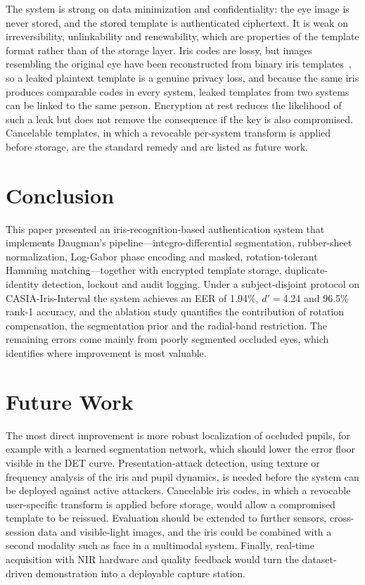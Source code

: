 \documentclass[conference]{IEEEtran}
\begin{document}
The system is strong on data minimization and confidentiality: the eye image is never stored, and the stored template is authenticated ciphertext. It is weak on irreversibility, unlinkability and renewability, which are properties of the template format rather than of the storage layer. Iris codes are lossy, but images resembling the original eye have been reconstructed from binary iris templates~\cite{galbally2013}, so a leaked plaintext template is a genuine privacy loss, and because the same iris produces comparable codes in every system, leaked templates from two systems can be linked to the same person. Encryption at rest reduces the likelihood of such a leak but does not remove the consequence if the key is also compromised. Cancelable templates, in which a revocable per-system transform is applied before storage, are the standard remedy and are listed as future work.

\section{Conclusion}
This paper presented an iris-recognition-based authentication system that implements Daugman's pipeline---integro-differential segmentation, rubber-sheet normalization, Log-Gabor phase encoding and masked, rotation-tolerant Hamming matching---together with encrypted template storage, duplicate-identity detection, lockout and audit logging. Under a subject-disjoint protocol on CASIA-Iris-Interval the system achieves an EER of 1.94\%, $d'=$4.24 and 96.5\% rank-1 accuracy, and the ablation study quantifies the contribution of rotation compensation, the segmentation prior and the radial-band restriction. The remaining errors come mainly from poorly segmented occluded eyes, which identifies where improvement is most valuable.

\section{Future Work}
The most direct improvement is more robust localization of occluded pupils, for example with a learned segmentation network, which should lower the error floor visible in the DET curve. Presentation-attack detection, using texture or frequency analysis of the iris and pupil dynamics, is needed before the system can be deployed against active attackers. Cancelable iris codes, in which a revocable user-specific transform is applied before storage, would allow a compromised template to be reissued. Evaluation should be extended to further sensors, cross-session data and visible-light images, and the iris could be combined with a second modality such as face in a multimodal system. Finally, real-time acquisition with NIR hardware and quality feedback would turn the dataset-driven demonstration into a deployable capture station.
\end{document}
